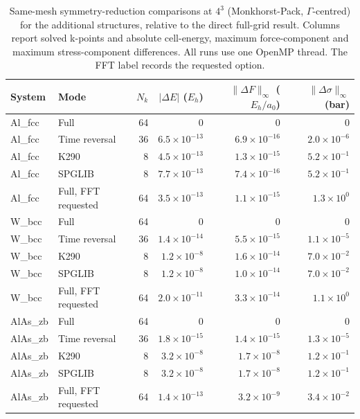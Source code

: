 \begin{table}[htbp]
\centering\small\setlength{\tabcolsep}{4pt}
\caption{Same-mesh symmetry-reduction comparisons at $4^3$ (Monkhorst-Pack, $\Gamma$-centred) for the additional structures, relative to the direct full-grid result. Columns report solved k-points and absolute cell-energy, maximum force-component and maximum stress-component differences. All runs use one OpenMP thread. The FFT label records the requested option.}
\label{tab:symmetry-validation-additional-gamma}
\begin{tabular}{llrrrr}
\toprule
System & Mode & $N_k$ & $|\Delta E|$ ($E_h$) & $\|\Delta F\|_\infty$ ($E_h/a_0$) & $\|\Delta\sigma\|_\infty$ (bar) \\
\midrule
Al\_fcc & Full & 64 & $0$ & $0$ & $0$ \\
Al\_fcc & Time reversal & 36 & $6.5\times10^{-13}$ & $6.9\times10^{-16}$ & $2.0\times10^{-6}$ \\
Al\_fcc & K290 & 8 & $4.5\times10^{-13}$ & $1.3\times10^{-15}$ & $5.2\times10^{-1}$ \\
Al\_fcc & SPGLIB & 8 & $7.7\times10^{-13}$ & $7.4\times10^{-16}$ & $5.2\times10^{-1}$ \\
Al\_fcc & Full, FFT requested & 64 & $3.5\times10^{-13}$ & $1.1\times10^{-15}$ & $1.3\times10^{0}$ \\
W\_bcc & Full & 64 & $0$ & $0$ & $0$ \\
W\_bcc & Time reversal & 36 & $1.4\times10^{-14}$ & $5.5\times10^{-15}$ & $1.1\times10^{-5}$ \\
W\_bcc & K290 & 8 & $1.2\times10^{-8}$ & $1.6\times10^{-14}$ & $7.0\times10^{-2}$ \\
W\_bcc & SPGLIB & 8 & $1.2\times10^{-8}$ & $1.0\times10^{-14}$ & $7.0\times10^{-2}$ \\
W\_bcc & Full, FFT requested & 64 & $2.0\times10^{-11}$ & $3.3\times10^{-14}$ & $1.1\times10^{0}$ \\
AlAs\_zb & Full & 64 & $0$ & $0$ & $0$ \\
AlAs\_zb & Time reversal & 36 & $1.8\times10^{-15}$ & $1.4\times10^{-15}$ & $1.3\times10^{-5}$ \\
AlAs\_zb & K290 & 8 & $3.2\times10^{-8}$ & $1.7\times10^{-8}$ & $1.2\times10^{-1}$ \\
AlAs\_zb & SPGLIB & 8 & $3.2\times10^{-8}$ & $1.7\times10^{-8}$ & $1.2\times10^{-1}$ \\
AlAs\_zb & Full, FFT requested & 64 & $1.4\times10^{-13}$ & $3.2\times10^{-9}$ & $3.4\times10^{-2}$ \\

\end{tabular}
\end{table}
